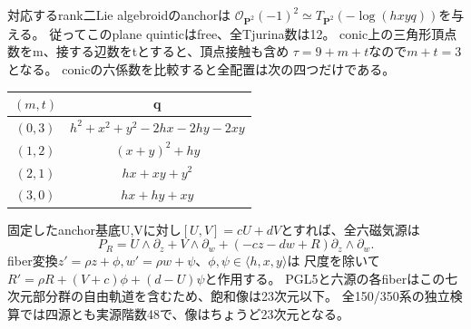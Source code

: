 \documentclass[a4paper,11pt]{ltjsarticle}
\theoremstyle{definition}
\newcommand{\PP}{\mathbf P}
\begin{document}
対応するrank二Lie algebroidのanchorは
$\mathcal O_{\PP^2}(-1)^2\simeq T_{\PP^2}(-\log(hxyq))$を与える。
従ってこのplane quinticはfree、全Tjurina数は12。
conic上の三角形頂点数をm、接する辺数をtとすると、頂点接触も含め
$\tau=9+m+t$なので$m+t=3$となる。
conicの六係数を比較すると全配置は次の四つだけである。
\begin{center}\small
\begin{tabular}{c|c}
$(m,t)$&q\\\hline
$(0,3)$&$h^2+x^2+y^2-2hx-2hy-2xy$\\
$(1,2)$&$(x+y)^2+hy$\\
$(2,1)$&$hx+xy+y^2$\\
$(3,0)$&$hx+hy+xy$
\end{tabular}
\end{center}
固定したanchor基底U,Vに対し$[U,V]=cU+dV$とすれば、全六磁気源は
\[
 P_R=U\wedge\partial_z+V\wedge\partial_w+(-cz-dw+R)\partial_z\wedge\partial_w.
\]
fiber変換$z'=\rho z+\phi,w'=\rho w+\psi$、$\phi,\psi\in\langle h,x,y\rangle$は
尺度を除いて$R'=\rho R+(V+c)\phi+(d-U)\psi$と作用する。
PGL5と六源の各fiberはこの七次元部分群の自由軌道を含むため、飽和像は23次元以下。
全150/350系の独立検算では四源とも実源階数48で、像はちょうど23次元となる。
\end{document}
